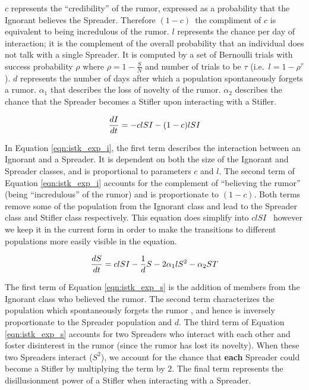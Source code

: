 $ c $ represents the ``credibility'' of the rumor, expressed as a probability that the Ignorant believes the Spreader. Therefore $ (1 - c) $\, the compliment of $ c $ is equivalent to being incredulous of the rumor. $ l $ represents the chance per day of interaction; it is the complement of the overall probability that an individual does not talk with a single Spreader. It is computed by a set of Bernoulli trials with success probability $ \rho $ where $ \rho = 1 - \frac{S}{N} $ and number of trials to be $ \tau $ (i.e.~$ l = 1 - \rho^\tau $ ). $ d $ represents the number of days after which a population spontaneously forgets a rumor. $\alpha_1$ that describes the loss of novelty of the rumor. $ \alpha_2 $ describes the chance that the Spreader becomes a Stifler upon interacting with a Stifler.

\begin{equation}
\label{eqn:istk_exp_i}
\frac{dI}{dt}  = - clSI - (1-c)lSI \\
\end{equation}

In Equation \ref{eqn:istk_exp_i}, the first term describes the interaction between an Ignorant and a Spreader. It is dependent on both the size of the Ignorant and Spreader classes, and is proportional to parameters $ c $ and $ l $.  The second term of Equation \ref{eqn:istk_exp_i} accounts for the complement of ``believing the rumor'' (being ``incredulous'' of the rumor) and is proportionate to $ (1 - c) $. Both terms remove some of the population from the Ignorant class and lead to the Spreader class and Stifler class respectively. This equation does simplify into $ clSI $ \, however we keep it in the current form in order to make the transitions to different populations more easily visible in the equation.

\begin{equation}
\label{eqn:istk_exp_s} \frac{dS}{dt} = clSI - \frac{1}{d} S - 2 \alpha_1l S^2 - \alpha_2 ST \\
\end{equation}

The first term of Equation \ref{eqn:istk_exp_s} is the addition of members from the Ignorant class who believed the rumor. The second term characterizes the population which spontaneously forgets the rumor , and hence is inversely proportionate to the Spreader population and $ d $. The third term of Equation \ref{eqn:istk_exp_s} accounts for two Spreaders who interact with each other and foster disinterest in the rumor (since the rumor has lost its novelty). When these two Spreaders interact ($S^2$), we account for the chance that \textbf{each} Spreader could become a Stifler by multiplying the term by $ 2 $. The final term represents the disillusionment power of a Stifler when interacting with a Spreader.

